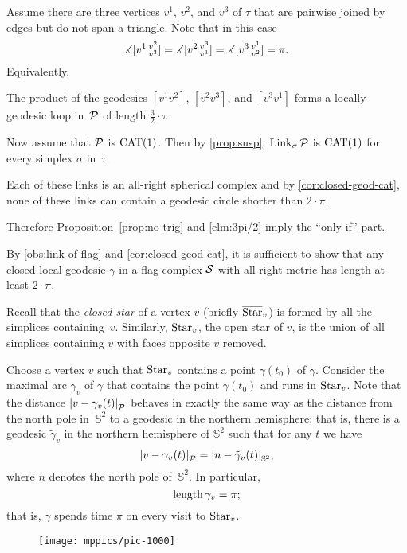 Assume there are three vertices $v^1$, $v^2$, and $v^3$ of $\tau$
that are pairwise joined by edges 
but do not span a triangle.
Note that in this case 
\[
\measuredangle[v^1\,{}^{v^2}_{v^3}]=
\measuredangle[v^2\,{}^{v^3}_{v^1}]=
\measuredangle[v^3\,{}^{v^1}_{v^2}]=
\pi.
\]
Equivalently,
\begin{clm}{}\label{clm:3pi/2}
The product
of the geodesics $[v^1v^2]$, $[v^2v^3]$, and $[v^3v^1]$
forms a locally geodesic loop in~$\mathcal{P}$ of length $\tfrac32\cdot\pi$.
\end{clm}

Now assume that $\mathcal{P}$ is $\mathrm{CAT}(1)$.
Then by \ref{prop:susp},
$\mathop{\rm Link}\nolimits_\sigma\mathcal{P}$ is $\mathrm{CAT}(1)$ for every simplex $\sigma$ 
in~$\tau$. 

Each of these links is an all-right spherical complex and by \ref{cor:closed-geod-cat}, none of these links can contain a geodesic circle shorter than $2\cdot\pi$. 

Therefore Proposition~\ref{prop:no-trig} and \ref{clm:3pi/2} 
imply the ``only if'' part.

By \ref{obs:link-of-flag} and \ref{cor:closed-geod-cat},
it is sufficient to show that any closed local geodesic $\gamma$ 
in a flag complex $\mathcal{S}$ with all-right metric has length at least $2\cdot\pi$.

Recall that the  \emph{closed star} of a vertex $v$ (briefly $\overline {\mathop{\rm Star}\nolimits}_v$)
is formed by all the simplices containing~$v$. 
Similarly, $\mathop{\rm Star}\nolimits_v$, the open star of $v$, is the union of all simplices containing $v$ with faces opposite $v$ removed.

Choose a vertex $v$ such that $\mathop{\rm Star}\nolimits_v$ contains a point $\gamma(t_0)$ of $\gamma$.
Consider the maximal arc $\gamma_v$ of $\gamma$ 
that contains the point $\gamma(t_0)$
and runs in $\mathop{\rm Star}\nolimits_v$.
Note that the distance $\dist{v}{\gamma_v(t)}{\spc{P}}$ behaves in exactly the same way 
as the distance from the north pole in~$\mathbb{S}^2$ to a geodesic in the northern hemisphere;
that is, there is a geodesic $\tilde\gamma_v$ in the northern hemisphere of $\mathbb{S}^2$ such that for any $t$ we have
\[\dist{v}{\gamma_v(t)}{\spc{P}}
=
\dist{n}{\tilde\gamma_v(t)}{\mathbb{S}^2},\]
where $n$ denotes the north pole of~$\mathbb{S}^2$.
In particular, 
\[\mathop{\rm length}\nolimits\gamma_v=\pi;\]
that is, $\gamma$ spends time $\pi$ on every visit to $\mathop{\rm Star}\nolimits_v$.

\begin{wrapfigure}{r}{45mm}
\vskip-2mm
\centering
\texttt{[image: mppics/pic-1000]}
\end{wrapfigure}

